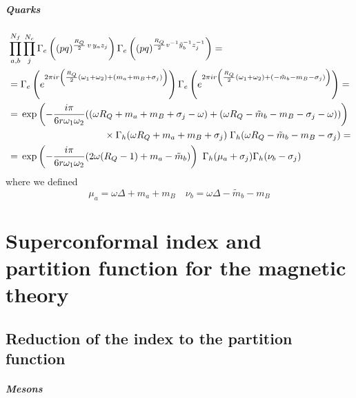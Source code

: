 \begin{appendices}
\paragraph{Quarks}
\begin{equation}
\begin{aligned}
&\prod_{a,b}^{N_f} \prod_{j}^{N_c}
\Gamma_e\left(
(pq)^{\frac{R_Q}{2} \, v \,  y_a z_j }\right) 
\Gamma_e\left(
(pq)^{\frac{R_Q}{2} v^{-1} \tilde y_b^{-1} z_j^{-1} } \right)  = \\
& =
\Gamma_e\left( e^{2 \pi i  r  \left( {R_Q \over 2} (\omega_1 + \omega_2)  + ( m_a + m_B + \sigma_j) \right) } \right )
\Gamma_e\left( e^{2 \pi i r  \left( {R_Q \over 2} (\omega_1 + \omega_2) + ( -\tilde{m}_b - m_B - \sigma_j) \right) } \right) = \\
& =   \,\exp \left( {- \frac{i \pi} {6 r \omega_1 \omega_2 }  ( ( \omega R_Q + m_a + m_B + \sigma_j -  \omega) + ( \omega R_Q -\tilde{m}_b - m_B - \sigma_j -  \omega))} \right) \\
& \qquad  \qquad \qquad \qquad \qquad  \times \Gamma_h ( \omega R_Q + m_a + m_B + \sigma_j) \; \Gamma_h ( \omega R_Q - \tilde{m}_b - m_B - \sigma_j) = \\
& =\, \exp \left( {- \frac{i \pi} {6 r \omega_1 \omega_2 }  ( 2 \omega (R_Q - 1) + m_a - \tilde{m}_b )} \right)  \, \, \Gamma_h ( \mu_a + \sigma_j) \Gamma_h ( \nu_b - \sigma_j)
\end{aligned}
\end{equation}
where we defined
\begin{equation}
 \mu_a = \omega \Delta + m_a + m_B  \quad  \nu_b = \omega \Delta - \tilde m_b - m_B
\end{equation}













\chapter[Index and PF for the magnetic theory]{Superconformal index and 
partition function for the magnetic theory}
\label{appendix:magnetic_theory_calculations}
\section{Reduction of the index to the partition function}
\paragraph{Mesons}


\end{appendices}
